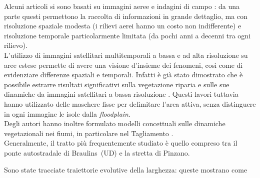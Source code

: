 Alcuni articoli si sono basati su immagini aeree e indagini di campo : da una parte questi permettono la raccolta di informazioni in grande dettaglio, ma con risoluzione spaziale modesta (i rilievi aerei hanno un costo non indifferente) e risoluzione temporale particolarmente limitata (da pochi anni a decenni tra ogni rilievo).
\\
L'utilizzo di immagini satellitari multitemporali a bassa e ad alta risoluzione su aree estese permette di avere una visione d'insieme dei fenomeni, così come di evidenziare differenze spaziali e temporali.
Infatti è già stato dimostrato che è possibile estrarre risultati significativi sulla vegetazione riparia e sulle sue dinamiche da immagini satellitari a bassa risoluzione .
Questi lavori tuttavia hanno utilizzato delle maschere fisse per delimitare l'area attiva, senza distinguere in ogni immagine le isole dalla \emph{floodplain}.
\\
Degli autori hanno inoltre formulato modelli concettuali sulle dinamiche vegetazionali nei fiumi, in particolare nel Tagliamento .
\\
Generalmente, il tratto più frequentemente studiato è quello compreso tra il ponte autostradale di Braulins~(UD) e la stretta di Pinzano.

Sono state tracciate traiettorie evolutive della larghezza: queste mostrano come 

